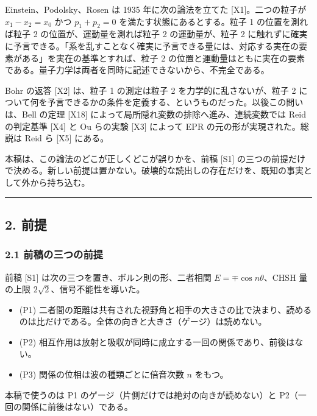 \documentclass[
  a4paper,
]{ltjsarticle}
\providecommand{\tightlist}{%
  \setlength{\itemsep}{0pt}\setlength{\parskip}{0pt}}
\begin{document}
Einstein、Podolsky、Rosen は 1935 年に次の論法を立てた
{[}X1{]}。二つの粒子が \(x_1-x_2=x_0\) かつ \(p_1+p_2=0\)
を満たす状態にあるとする。粒子 1 の位置を測れば粒子 2
の位置が、運動量を測れば粒子 2 の運動量が、粒子 2
に触れずに確実に予言できる。「系を乱すことなく確実に予言できる量には、対応する実在の要素がある」を実在の基準とすれば、粒子
2
の位置と運動量はともに実在の要素である。量子力学は両者を同時に記述できないから、不完全である。

Bohr の返答 {[}X2{]} は、粒子 1 の測定は粒子 2
を力学的に乱さないが、粒子 2
について何を予言できるかの条件を定義する、というものだった。以後この問いは、Bell
の定理 {[}X18{]} によって局所隠れ変数の排除へ進み、連続変数では Reid
の判定基準 {[}X4{]} と Ou らの実験 {[}X3{]} によって EPR
の元の形が実現された。総説は Reid ら {[}X5{]} にある。

本稿は、この論法のどこが正しくどこが誤りかを、前稿 {[}S1{]}
の三つの前提だけで決める。新しい前提は置かない。破壊的な読出しの存在だけを、既知の事実として外から持ち込む。

\begin{center}\rule{0.5\linewidth}{0.5pt}\end{center}

\subsection{2. 前提}\label{ux524dux63d0}

\subsubsection{2.1
前稿の三つの前提}\label{ux524dux7a3fux306eux4e09ux3064ux306eux524dux63d0}

前稿 {[}S1{]} は次の三つを置き、ボルン則の形、二者相関
\(E=\mp\cos n\theta\)、CHSH 量の上限 \(2\sqrt2\)、信号不能性を導いた。

\begin{itemize}
\tightlist
\item
  (P1)
  二者間の距離は共有された視野角と相手の大きさの比で決まり、読めるのは比だけである。全体の向きと大きさ（ゲージ）は読めない。
\item
  (P2)
  相互作用は放射と吸収が同時に成立する一回の関係であり、前後はない。
\item
  (P3) 関係の位相は波の種類ごとに倍音次数 \(n\) をもつ。
\end{itemize}

本稿で使うのは P1 のゲージ（片側だけでは絶対の向きが読めない）と
P2（一回の関係に前後はない）である。
\end{document}
